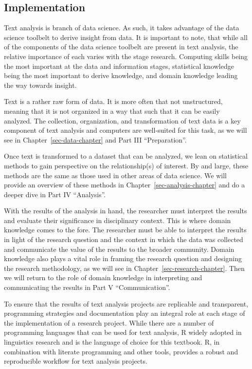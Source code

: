 \documentclass[
  letterpaper,
  krantz1]{latex/krantz-mod}
\theoremstyle{definition}
\theoremstyle{definition}
\theoremstyle{remark}
\begin{document}
\subsection{Implementation}\label{implementation}

Text analysis is branch of data science. As such, it takes advantage of
the data science toolbelt to derive insight from data. It is important
to note, that while all of the components of the data science toolbelt
are present in text analysis, the relative importance of each varies
with the stage research. Computing skills being the most important at
the data and information stages, statistical knowledge being the most
important to derive knowledge, and domain knowledge leading the way
towards insight.

Text is a rather raw form of data. It is more often that not
unstructured, meaning that it is not organized in a way that such that
it can be easily analyzed. The collection, organization, and
transformation of text data is a key component of text analysis and
computers are well-suited for this task, as we will see in
Chapter~\ref{sec-data-chapter} and Part III ``Preparation''.

Once text is transformed to a dataset that can be analyzed, we lean on
statistical methods to gain perspective on the relationship(s) of
interest. By and large, these methods are the same as those used in
other areas of data science. We will provide an overview of these
methods in Chapter~\ref{sec-analysis-chapter} and do a deeper dive in
Part IV ``Analysis''.

With the results of the analysis in hand, the researcher must interpret
the results and evaluate their significance in disciplinary context.
This is where domain knowledge comes to the fore. The researcher must be
able to interpret the results in light of the research question and the
context in which the data was collected and communicate the value of the
results to the broader community. Domain knowledge also plays a vital
role in framing the research question and designing the research
methodology, as we will see in Chapter~\ref{sec-research-chapter}. Then
we will return to the role of domain knowledge in interpreting and
communicating the results in Part V ``Communication''.

To ensure that the results of text analysis projects are replicable and
transparent, programming strategies and documentation play an integral
role at each stage of the implementation of a research project. While
there are a number of programming languages that can be used for text
analysis, R widely adopted in linguistics research and is the language
of choice for this textbook. R, in combination with literate programming
and other tools, provides a robust and reproducible workflow for text
analysis projects.
\end{document}
